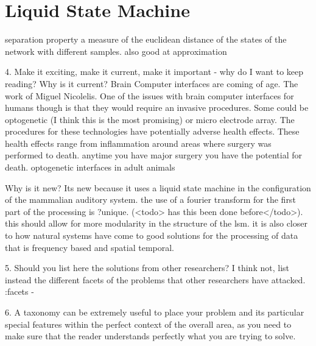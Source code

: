 \section {Liquid State Machine}

separation property a measure of the euclidean distance of the states of the network with different samples. 
also good at approximation


4. Make it exciting, make it current, make it important - why do I want to keep
reading?
Why is it current?
Brain Computer interfaces are coming of age. The work of Miguel Nicolelis.
One of the issues with brain computer interfaces for humans though is that they would require an invasive procedures. Some could be optogenetic (I think this is the most promising) or micro electrode array. The procedures for these technologies have potentially adverse health effects. These health effects range from inflammation around areas where surgery was performed to death. anytime you have major surgery you have the potential for death. optogenetic interfaces in adult animals

Why is it new?
Its new because it uses a liquid state machine in the configuration of the mammalian auditory system.
the use of a fourier transform for the first part of the processing is ?unique. (<todo> has this been done before</todo>). this should allow for more modularity in the structure of the lsm. it is also closer to how natural systems have come to good solutions for the processing of data that is frequency based and spatial temporal.



5. Should you list here the solutions from other researchers? I think not, list
instead the different facets of the problems that other researchers have attacked.
:facets - 



6. A taxonomy can be extremely useful to place your problem and its particular
special features within the perfect context of the overall area, as you need to
make sure that the reader understands perfectly what you are trying to solve.








\setlength{\unitlength}{\savedunitlength}
